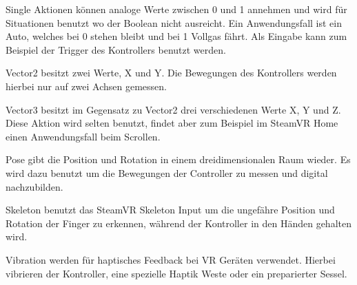 \begin{itemize}
Single Aktionen können analoge Werte zwischen 0 und 1 annehmen und wird für Situationen benutzt wo der Boolean nicht ausreicht.
Ein Anwendungsfall ist ein Auto, welches bei 0 stehen bleibt und bei 1 Vollgas fährt.
Als Eingabe kann zum Beispiel der Trigger des Kontrollers benutzt werden.

Vector2 besitzt zwei Werte, X und Y.
Die Bewegungen des Kontrollers werden hierbei nur auf zwei Achsen gemessen.

Vector3 besitzt im Gegensatz zu Vector2 drei verschiedenen Werte X, Y und Z.
Diese Aktion wird selten benutzt, findet aber zum Beispiel im SteamVR Home einen Anwendungsfall beim Scrollen.

Pose gibt die Position und Rotation in einem dreidimensionalen Raum wieder.
Es wird dazu benutzt um die Bewegungen der Controller zu messen und digital nachzubilden.

Skeleton benutzt das SteamVR Skeleton Input um die ungefähre Position und Rotation der Finger zu erkennen, während der Kontroller in den Händen gehalten wird.

Vibration werden für haptisches Feedback bei VR Geräten verwendet.
Hierbei vibrieren der Kontroller, eine spezielle Haptik Weste oder ein preparierter Sessel.
~\cite{SteamVR_Input_2022}


\end{itemize}
